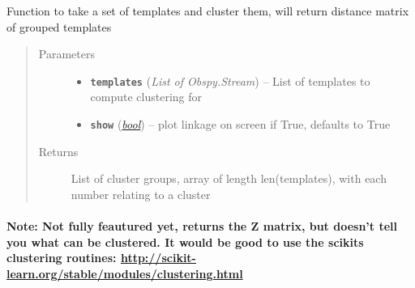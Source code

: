 \documentclass[a4paper,10pt,english]{sphinxmanual}
\begin{document}
\begin{fulllineitems}
\label{utils:clustering.cluster}
Function to take a set of templates and cluster them, will return distance            matrix of grouped templates
\begin{quote}\begin{description}
\item[{Parameters}] \leavevmode\begin{itemize}
\item {} 
\textbf{\texttt{templates}} (\emph{List of Obspy.Stream}) -- List of templates to compute clustering for

\item {} 
\textbf{\texttt{show}} (\href{https://docs.python.org/library/functions.html\#bool}{\emph{bool}}) -- plot linkage on screen if True, defaults to True

\end{itemize}

\item[{Returns}] \leavevmode
List of cluster groups, array of length len(templates), with
each number relating to a cluster

\end{description}\end{quote}
\paragraph{Note:
Not fully feautured yet, returns the Z matrix, but doesn't tell you what        can be clustered. It would be good to use the scikits clustering        routines: \href{http://scikit-learn.org/stable/modules/clustering.html}{http://scikit-learn.org/stable/modules/clustering.html}}

\end{fulllineitems}

\end{document}
